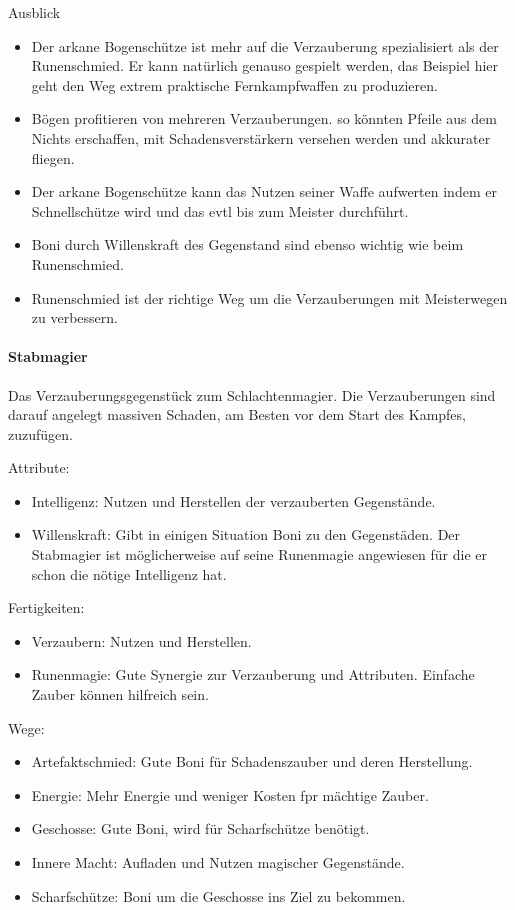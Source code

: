 \documentclass{article}
\begin{document}
Ausblick
\begin{itemize}
\item Der arkane Bogenschütze ist mehr auf die Verzauberung spezialisiert als der Runenschmied. Er kann natürlich genauso gespielt werden, das Beispiel hier geht den Weg extrem praktische Fernkampfwaffen zu produzieren.
\item Bögen profitieren von mehreren Verzauberungen. so könnten Pfeile aus dem Nichts erschaffen, mit Schadensverstärkern versehen werden und akkurater fliegen.
\item Der arkane Bogenschütze kann das Nutzen seiner Waffe aufwerten indem er Schnellschütze wird und das evtl bis zum Meister durchführt.
\item Boni durch Willenskraft des Gegenstand sind ebenso wichtig wie beim Runenschmied.
\item Runenschmied ist der richtige Weg um die Verzauberungen mit Meisterwegen zu verbessern.
\end{itemize}

\paragraph{Stabmagier}
Das Verzauberungsgegenstück zum Schlachtenmagier. Die Verzauberungen sind darauf angelegt massiven Schaden, am Besten
vor dem Start des Kampfes, zuzufügen.

Attribute:
\begin{itemize}
\item Intelligenz: Nutzen und Herstellen der verzauberten Gegenstände.
\item Willenskraft: Gibt in einigen Situation Boni zu den Gegenstäden. Der Stabmagier ist möglicherweise auf seine Runenmagie angewiesen für die er schon die nötige Intelligenz hat.
\end{itemize}

Fertigkeiten:
\begin{itemize}
\item Verzaubern: Nutzen und Herstellen.
\item Runenmagie: Gute Synergie zur Verzauberung und Attributen. Einfache Zauber können hilfreich sein.
\end{itemize}

Wege:
\begin{itemize}
\item Artefaktschmied: Gute Boni für Schadenszauber und deren Herstellung.
\item Energie: Mehr Energie und weniger Kosten fpr mächtige Zauber.
\item Geschosse: Gute Boni, wird für Scharfschütze benötigt.
\item Innere Macht: Aufladen und Nutzen magischer Gegenstände.
\item Scharfschütze: Boni um die Geschosse ins Ziel zu bekommen.
\end{itemize}
\end{document}
